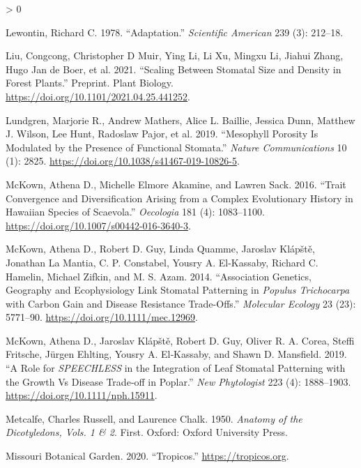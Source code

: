 \documentclass[
  10pt,
]{article}
\newlength{\cslhangindent}
\newenvironment{CSLReferences}[2] %
 {%
  \setlength{\parindent}{0pt}
  \ifodd #1 \everypar{\setlength{\hangindent}{\cslhangindent}}\ignorespaces\fi
  \ifnum #2 > 0
  \setlength{\parskip}{#2\baselineskip}
  \fi
 }%
 {}
\begin{document}
\begin{CSLReferences}{1}{0}
\leavevmode\hypertarget{ref-lewontin_adaptation_1978}{}%
Lewontin, Richard C. 1978. {``Adaptation.''} \emph{Scientific American} 239 (3): 212--18.

\leavevmode\hypertarget{ref-liu_scaling_2021}{}%
Liu, Congcong, Christopher D Muir, Ying Li, Li Xu, Mingxu Li, Jiahui Zhang, Hugo Jan de Boer, et al. 2021. {``Scaling Between Stomatal Size and Density in Forest Plants.''} Preprint. Plant Biology. \url{https://doi.org/10.1101/2021.04.25.441252}.

\leavevmode\hypertarget{ref-lundgren_mesophyll_2019}{}%
Lundgren, Marjorie R., Andrew Mathers, Alice L. Baillie, Jessica Dunn, Matthew J. Wilson, Lee Hunt, Radoslaw Pajor, et al. 2019. {``Mesophyll Porosity Is Modulated by the Presence of Functional Stomata.''} \emph{Nature Communications} 10 (1): 2825. \url{https://doi.org/10.1038/s41467-019-10826-5}.

\leavevmode\hypertarget{ref-mckown_trait_2016}{}%
McKown, Athena D., Michelle Elmore Akamine, and Lawren Sack. 2016. {``Trait Convergence and Diversification Arising from a Complex Evolutionary History in {Hawaiian} Species of {Scaevola}.''} \emph{Oecologia} 181 (4): 1083--1100. \url{https://doi.org/10.1007/s00442-016-3640-3}.

\leavevmode\hypertarget{ref-mckown_association_2014}{}%
McKown, Athena D., Robert D. Guy, Linda Quamme, Jaroslav Klápště, Jonathan La Mantia, C. P. Constabel, Yousry A. El-Kassaby, Richard C. Hamelin, Michael Zifkin, and M. S. Azam. 2014. {``Association Genetics, Geography and Ecophysiology Link Stomatal Patterning in \emph{{Populus} Trichocarpa} with Carbon Gain and Disease Resistance Trade-Offs.''} \emph{Molecular Ecology} 23 (23): 5771--90. \url{https://doi.org/10.1111/mec.12969}.

\leavevmode\hypertarget{ref-mckown_role_2019}{}%
McKown, Athena D., Jaroslav Klápště, Robert D. Guy, Oliver R. A. Corea, Steffi Fritsche, Jürgen Ehlting, Yousry A. El‐Kassaby, and Shawn D. Mansfield. 2019. {``A Role for \emph{SPEECHLESS} in the Integration of Leaf Stomatal Patterning with the Growth Vs Disease Trade‐off in Poplar.''} \emph{New Phytologist} 223 (4): 1888--1903. \url{https://doi.org/10.1111/nph.15911}.

\leavevmode\hypertarget{ref-metcalfe_anatomy_1950}{}%
Metcalfe, Charles Russell, and Laurence Chalk. 1950. \emph{Anatomy of the Dicotyledons, {Vols}. 1 \& 2}. First. Oxford: Oxford University Press.

\leavevmode\hypertarget{ref-missouri_botanical_garden_tropicos_2020}{}%
Missouri Botanical Garden. 2020. {``Tropicos.''} \url{https://tropicos.org}.


\end{CSLReferences}
\end{document}
